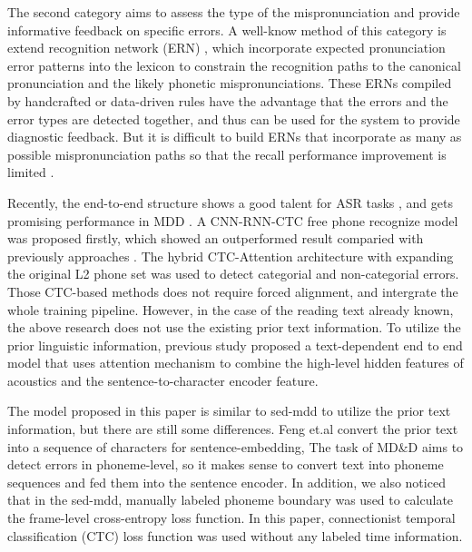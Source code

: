 \documentclass[a4paper]{article}
\begin{document}
The second category aims to assess the type of the mispronunciation and provide informative feedback on specific errors. A well-know method of this category is extend recognition network (ERN) \cite{Harrison2009ImplementationOA}, which incorporate expected pronunciation error patterns into the lexicon to constrain the recognition paths to the canonical pronunciation and the likely phonetic mispronunciations. These ERNs \cite{Harrison2009ImplementationOA,ERN,qianern} compiled by handcrafted or data-driven rules \cite{meng2007deriving} have the advantage that the errors and the error types are detected together, and thus can be used for the system to provide diagnostic feedback. But it is difficult to build ERNs that incorporate as many as possible mispronunciation paths so that the recall performance improvement is limited \cite{leung2019cnn}.

Recently, the end-to-end structure shows a good talent for ASR tasks \cite{graves2014towards,amodei2016deep}, and gets promising performance in MDD \cite{leung2019cnn,feng2020sed,yan2020end}. A CNN-RNN-CTC free phone recognize model was proposed \cite{leung2019cnn} firstly, which showed an outperformed result comparied with previously approaches \cite{li2016mispronunciation}. The hybrid CTC-Attention architecture \cite{yan2020end} with expanding the original L2 phone set was used to detect categorial and non-categorial errors. Those CTC-based methods does not require forced alignment, and intergrate the whole training pipeline. However, in the case of the reading text already known, the above research does not use the existing prior text information. To utilize the prior linguistic information, previous study \cite{feng2020sed} proposed a text-dependent end to end model that uses attention mechanism to combine the high-level hidden features of acoustics  and the sentence-to-character encoder feature. 

The model proposed in this paper is similar to sed-mdd \cite{feng2020sed} to utilize the prior text information, but there are still some differences. Feng et.al convert the prior text into a sequence of characters for sentence-embedding, The task of MD\&D aims to detect errors in phoneme-level, so it makes sense to convert text into phoneme sequences and fed them into the sentence encoder. In addition, we also noticed that in the sed-mdd, manually labeled phoneme boundary was used to calculate the frame-level cross-entropy loss function. In this paper, connectionist temporal classification (CTC) \cite{graves2006connectionist} loss function was used without any labeled time information.
\end{document}
